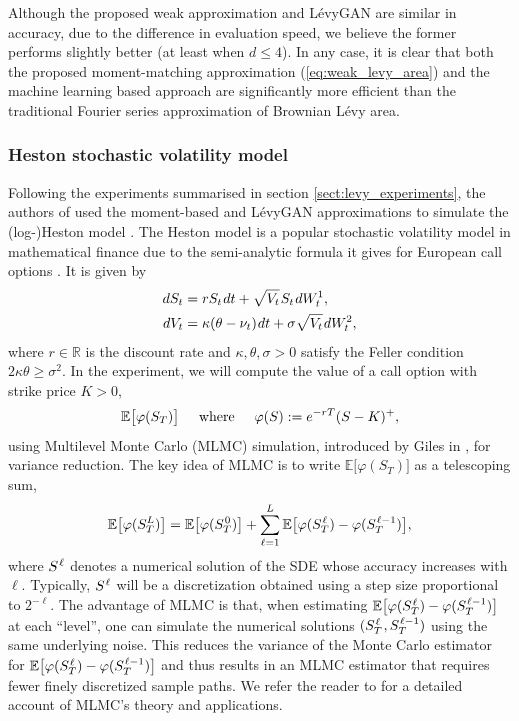 \documentclass[sn-mathphys-num]{sn-jnl}%
\newcommand{\E}{\mathbb{E}}
\newcommand{\R}{\mathbb{R}}
\newcommand{\m}{\hspace{0.25mm}}
\newcommand{\mm}{\hspace{5mm}}
\begin{document}
Although the proposed weak approximation and L\'{e}vyGAN are similar in accuracy, due to the difference in evaluation speed, we believe the former performs slightly better (at least when $d\leq 4$). In any case, it is clear that both the proposed moment-matching approximation (\ref{eq:weak_levy_area}) and the machine learning based approach \cite{jelincic2025levygan} are significantly more efficient than the traditional Fourier series approximation of Brownian L\'{e}vy area.

\subsubsection{Heston stochastic volatility model}

Following the experiments summarised in section \ref{sect:levy_experiments}, the authors of \cite{jelincic2025levygan} used the moment-based and L\'{e}vyGAN approximations to simulate the (log-)Heston model \cite{heston1993model}.
The Heston model is a popular stochastic volatility model in mathematical finance due to the semi-analytic formula it gives for European call options \cite{crisostomo2015heston}. It is given by
\begin{align}\label{eq:heston}
dS_t & = r S_t\m dt + \sqrt{V_t}\m S_t\m dW_t^1,\\
dV_t & = \kappa (\theta - \nu_t)\m dt + \sigma\sqrt{V_t}\m dW_t^2,\nonumber
\end{align}
where $r\in\R$ is the discount rate and $\kappa, \theta, \sigma > 0$ satisfy the Feller condition $2\kappa\theta \geq \sigma^2$. In the experiment, we will compute the value of a call option with strike price $K > 0$,
\begin{align}\label{eq:option_price}
\E\big[\varphi(S_T)\big] \mm\text{where}\mm \varphi(S) := e^{-rT}(S - K)^{+},
\end{align}
using Multilevel Monte Carlo (MLMC) simulation, introduced by Giles in \cite{giles2008mlmc}, for variance reduction. The key idea of MLMC is to write $\E\big[\varphi(S_T)\big]$ as a telescoping sum,
\begin{align}\label{eq:mlmc}
\E\big[\varphi(S_T^L)\big] = \E\big[\varphi(S_T^{\m 0})\big] + \sum_{\ell = 1}^{L}  \E\big[\varphi(S_T^{\m\ell}) - \varphi(S_T^{\m\ell - 1})\big],
\end{align}
where $S^{\m\ell}$ denotes a numerical solution of the SDE whose accuracy increases with $\ell$.
Typically, $S^{\m\ell}$ will be a discretization obtained using a step size proportional to $2^{-\ell}$.
The advantage of MLMC is that, when estimating $\E\big[\varphi(S_T^{\m\ell}) - \varphi(S_T^{\m\ell - 1})\big]$ at each ``level'', one can simulate the numerical solutions $(S_T^{\m\ell}\m, S_T^{\m\ell - 1})$ using the same underlying noise. This reduces the variance of the Monte Carlo estimator for $\E\big[\varphi(S_T^{\m\ell}) - \varphi(S_T^{\m\ell - 1})\big]$ and thus results in an MLMC estimator that requires fewer finely discretized sample paths.
We refer the reader to \cite{giles2015mlmc} for a detailed account of MLMC's theory and applications.\medbreak
\end{document}

